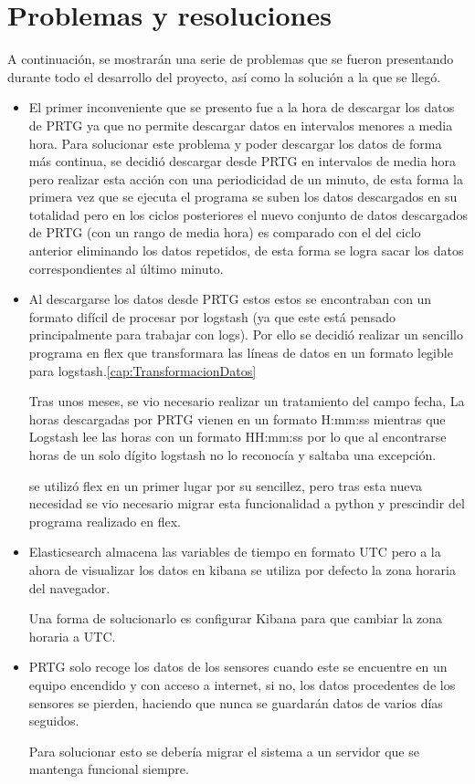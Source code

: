 \section{Problemas y resoluciones}\label{cap:Problemas}
A continuación, se mostrarán una serie de problemas que se fueron presentando durante todo el desarrollo del proyecto, así como la solución a la que se llegó.

\begin{itemize}
    \item El primer inconveniente que se presento fue a la hora de descargar los datos de PRTG ya que no permite descargar datos en intervalos menores a media hora. Para solucionar este problema y poder descargar los datos de forma más continua, se decidió descargar desde PRTG en intervalos de media hora pero realizar esta acción con una periodicidad de un minuto, de esta forma la primera vez que se ejecuta el programa se suben los datos descargados en su totalidad pero en los ciclos posteriores el nuevo conjunto de datos descargados de PRTG (con un rango de media hora) es comparado con el del ciclo anterior eliminando los datos repetidos, de esta forma se logra sacar los datos correspondientes al último minuto.
    
    
    \item Al descargarse los datos desde PRTG estos estos se encontraban con un formato difícil de procesar por logstash (ya que este está pensado principalmente para trabajar con logs). Por ello se decidió realizar un sencillo programa en flex que transformara las líneas de datos en un formato legible para logstash.\ref{cap:TransformacionDatos}
    
    Tras unos meses, se vio necesario realizar un tratamiento del campo fecha, La horas descargadas por PRTG vienen en un formato H:mm:ss mientras que Logstash lee las horas con un formato HH:mm:ss por lo que al encontrarse horas de un solo dígito logstash no lo reconocía y saltaba una excepción.
    
    se utilizó flex en un primer lugar por su sencillez, pero tras esta nueva necesidad se vio necesario migrar esta funcionalidad a python y prescindir del programa realizado en flex.
    
    \item Elasticsearch almacena las variables de tiempo en formato UTC pero a la ahora de visualizar los datos en kibana se utiliza por defecto la zona horaria del navegador.
    
    Una forma de solucionarlo es configurar Kibana para que cambiar la zona horaria a UTC.
    
    \item PRTG solo recoge los datos de los sensores cuando este se encuentre en un equipo encendido y con acceso a internet, si no, los datos procedentes de los sensores se pierden, haciendo que nunca se guardarán datos de varios días seguidos.
    
    Para solucionar esto se debería migrar el sistema a un servidor que se mantenga funcional siempre.
\end{itemize}
